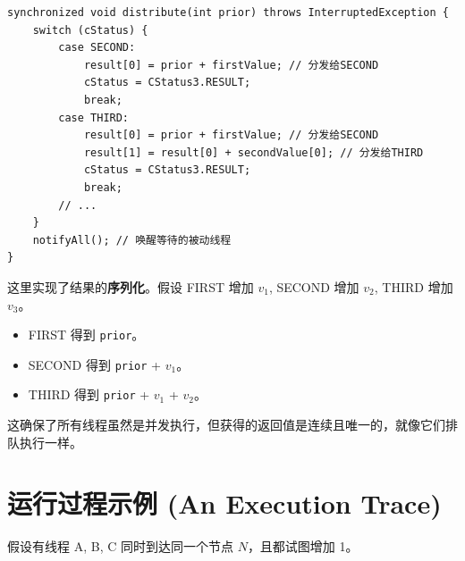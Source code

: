 \documentclass[UTF8,a4paper,12pt]{ctexart}
\begin{document}
\begin{lstlisting}
synchronized void distribute(int prior) throws InterruptedException {
    switch (cStatus) {
        case SECOND:
            result[0] = prior + firstValue; // 分发给SECOND
            cStatus = CStatus3.RESULT;
            break;
        case THIRD:
            result[0] = prior + firstValue; // 分发给SECOND
            result[1] = result[0] + secondValue[0]; // 分发给THIRD
            cStatus = CStatus3.RESULT;
            break;
        // ...
    }
    notifyAll(); // 唤醒等待的被动线程
}
\end{lstlisting}
这里实现了结果的\textbf{序列化}。假设 FIRST 增加 $v_1$, SECOND 增加 $v_2$, THIRD 增加 $v_3$。
\begin{itemize}
    \item FIRST 得到 \texttt{prior}。
    \item SECOND 得到 \texttt{prior} + $v_1$。
    \item THIRD 得到 \texttt{prior} + $v_1$ + $v_2$。
\end{itemize}
这确保了所有线程虽然是并发执行，但获得的返回值是连续且唯一的，就像它们排队执行一样。

\section{运行过程示例 (An Execution Trace)}

假设有线程 A, B, C 同时到达同一个节点 $N$，且都试图增加 1。
\end{document}
